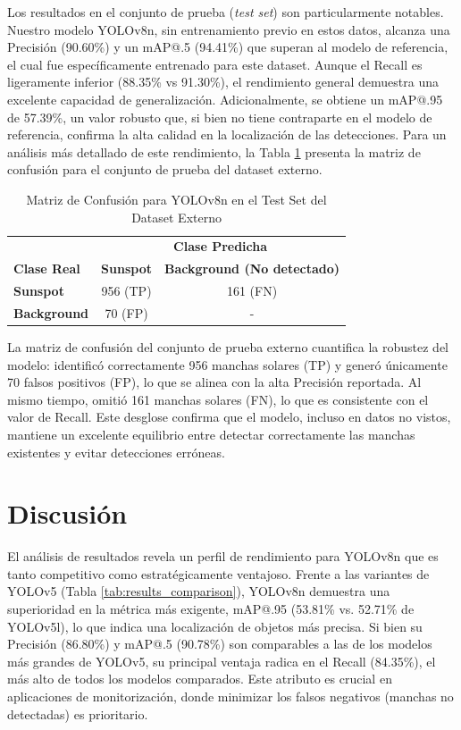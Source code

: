 \documentclass[journal]{IEEEtran}
\begin{document}
Los resultados en el conjunto de prueba (\textit{test set}) son particularmente notables. Nuestro modelo YOLOv8n, sin entrenamiento previo en estos datos, alcanza una Precisión (90.60\%) y un mAP@.5 (94.41\%) que superan al modelo de referencia, el cual fue específicamente entrenado para este dataset. Aunque el Recall es ligeramente inferior (88.35\% vs 91.30\%), el rendimiento general demuestra una excelente capacidad de generalización. Adicionalmente, se obtiene un mAP@.95 de 57.39\%, un valor robusto que, si bien no tiene contraparte en el modelo de referencia, confirma la alta calidad en la localización de las detecciones. Para un análisis más detallado de este rendimiento, la Tabla \ref{tab:confusion_matrix_external} presenta la matriz de confusión para el conjunto de prueba del dataset externo.
\begin{table}[htbp]
\centering
\caption{Matriz de Confusión para YOLOv8n en el Test Set del Dataset Externo}
\label{tab:confusion_matrix_external}
\begin{tabular}{@{}l|cc@{}}
\toprule
\textbf{} & \multicolumn{2}{c}{\textbf{Clase Predicha}} \\
\textbf{Clase Real} & \textbf{Sunspot} & \textbf{Background (No detectado)} \\
\midrule
\textbf{Sunspot} & 956 (TP) & 161 (FN) \\
\textbf{Background} & 70 (FP) & - \\
\bottomrule
\end{tabular}
\end{table}

La matriz de confusión del conjunto de prueba externo cuantifica la robustez del modelo: identificó correctamente 956 manchas solares (TP) y generó únicamente 70 falsos positivos (FP), lo que se alinea con la alta Precisión reportada. Al mismo tiempo, omitió 161 manchas solares (FN), lo que es consistente con el valor de Recall. Este desglose confirma que el modelo, incluso en datos no vistos, mantiene un excelente equilibrio entre detectar correctamente las manchas existentes y evitar detecciones erróneas.
\section{Discusión}

El análisis de resultados revela un perfil de rendimiento para YOLOv8n que es tanto competitivo como estratégicamente ventajoso. Frente a las variantes de YOLOv5 (Tabla \ref{tab:results_comparison}), YOLOv8n demuestra una superioridad en la métrica más exigente, mAP@.95 (53.81\% vs. 52.71\% de YOLOv5l), lo que indica una localización de objetos más precisa. Si bien su Precisión (86.80\%) y mAP@.5 (90.78\%) son comparables a las de los modelos más grandes de YOLOv5, su principal ventaja radica en el Recall (84.35\%), el más alto de todos los modelos comparados. Este atributo es crucial en aplicaciones de monitorización, donde minimizar los falsos negativos (manchas no detectadas) es prioritario.
\end{document}
